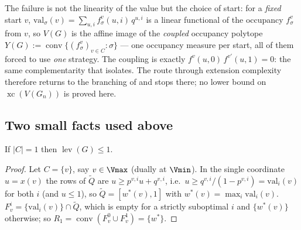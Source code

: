 \begin{remark}\label{xc:coupled}
The failure is not the linearity of the value but the choice of start: for a \emph{fixed} start
$v$, $\mathrm{val}_\sigma(v)=\sum_{u,i}f^{v}_\sigma(u,i)\,q^{u,i}$ is a linear functional of the
occupancy $f^{v}_\sigma$ from $v$, so $V(G)$ is the affine image of the \emph{coupled}
occupancy polytope $Y(G):=\operatorname{conv}\{(f^{v}_\sigma)_{v\in C}:\sigma\}$ --- one
occupancy measure per start, all of them forced to use \emph{one} strategy.  The coupling is
exactly $f^{v}(u,0)\,f^{v'}(u,1)=0$: the same complementarity that
 isolates.  The route through extension complexity therefore
returns to the branching of  and stops there; no lower bound on
$\operatorname{xc}(V(G_n))$ is proved here.
\end{remark}

\subsection{Two small facts used above}\label{xc:small}

\begin{lemma}\label{xc:onectrl}
If $|C|=1$ then $\operatorname{lev}(G)\le1$.
\end{lemma}

\begin{proof}
Let $C=\{v\}$, say $v\in\Vmax$ (dually at $\Vmin$).  In the single coordinate $u=x(v)$ the rows
of $\widetilde Q$ are $u\ge p^{v,i}u+q^{v,i}$, i.e.\ $u\ge q^{v,i}/(1-p^{v,i})=\mathrm{val}_i(v)$
for both $i$ (and $u\le1$), so $\widetilde Q=[w^{\ast}(v),1]$ with
$w^{\ast}(v)=\max_i\mathrm{val}_i(v)$.  $F^{i}_{v}=\{\mathrm{val}_i(v)\}\cap\widetilde Q$, which
is empty for a strictly suboptimal $i$ and $\{w^{\ast}(v)\}$ otherwise; so
$R_1=\operatorname{conv}(F^{0}_v\cup F^{1}_v)=\{w^{\ast}\}$.
\end{proof}

